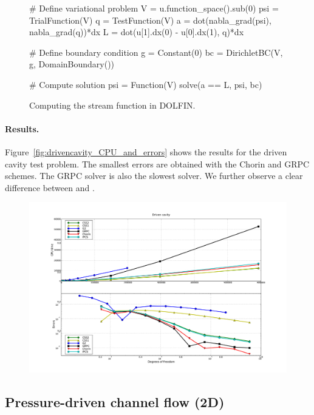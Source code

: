 \begin{figure}
\bwfig
    \begin{python}
# Define variational problem
V   = u.function_space().sub(0)
psi = TrialFunction(V)
q   = TestFunction(V)
a   = dot(nabla_grad(psi), nabla_grad(q))*dx
L   = dot(u[1].dx(0) - u[0].dx(1), q)*dx

# Define boundary condition
g  = Constant(0)
bc = DirichletBC(V, g, DomainBoundary())

# Compute solution
psi = Function(V)
solve(a == L, psi, bc)
    \end{python}
    \caption{Computing the stream function in DOLFIN.}
    \label{fig:streamfunction}
\end{figure}

\paragraph{Results.}

Figure~\ref{fig:drivencavity_CPU_and_errors} shows the results for the
driven cavity test problem.  The smallest errors are obtained with the
Chorin and GRPC schemes. The GRPC solver is also the slowest
solver. We further observe a clear difference between  and
.

\begin{figure}
          {\includegraphics[width=\fullfig]{chapters/kvs-1/pdf/new_drivencavity_res.pdf}}
\end{figure}

\subsection{Pressure-driven channel flow (2D)}

